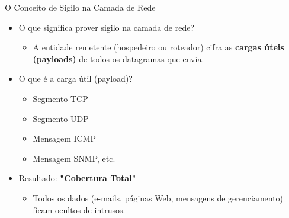 \begin{frame}{O Conceito de Sigilo na Camada de Rede}
    \begin{itemize}
        \item O que significa prover sigilo na camada de rede?
              \begin{itemize}
                  \item A entidade remetente (hospedeiro ou roteador) cifra as \textbf{cargas úteis (payloads)} de todos os datagramas que envia.
              \end{itemize}

        \item O que é a carga útil (payload)?
              \begin{itemize}
                  \item Segmento TCP
                  \item Segmento UDP
                  \item Mensagem ICMP
                  \item Mensagem SNMP, etc.
              \end{itemize}

        \item Resultado: \textbf{"Cobertura Total" }
              \begin{itemize}
                  \item Todos os dados (e-mails, páginas Web, mensagens de gerenciamento) ficam ocultos de intrusos.
              \end{itemize}
    \end{itemize}
\end{frame}



